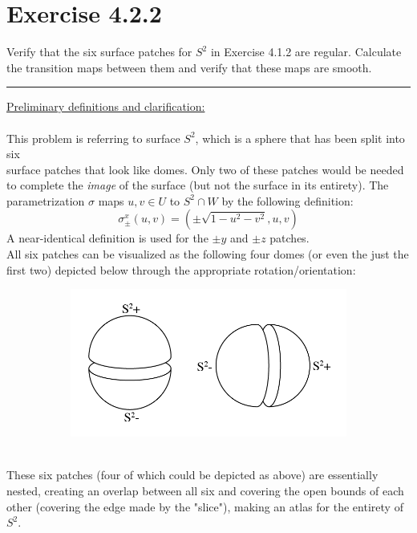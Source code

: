 \documentclass[12pt]{article}
\begin{document}
\maketitle

\section*{Exercise 4.2.2}
Verify that the six surface patches for $S^2$ in Exercise 4.1.2 are regular. Calculate the transition maps between them and verify that these maps are smooth.

\vspace{1cm}
\hrule
\vspace{1cm}
\noindent
\underline{Preliminary definitions and clarification:}\\\\
This problem is referring to surface $S^2$, which is a sphere that has been split into six \\ surface patches that look like domes. Only two of these patches would be needed to complete the \emph{image} of the surface (but not the surface in its entirety). The parametrization $\sigma$ maps $u,v \in U$ to $S^2 \cap W$ by the following definition:
$$
\sigma^{x}_{\pm}(u,v) = (\pm \sqrt{1-u^2-v^2}, u ,v)
$$
\indent
A near-identical definition is used for the $\pm y$ and $\pm z$ patches.\\
\indent
All six patches can be visualized as the following four domes (or even the just the first two) depicted below through the appropriate rotation/orientation:
\begin{figure}[h!]
  \centering
      \begin{subfigure}[b]{0.5\linewidth}
    \includegraphics[width=\linewidth]{./assets/4-2-2/s2-patches.png}
  \end{subfigure}
  \end{figure}
  \\
	\indent
	These six patches (four of which could be depicted as above) are essentially nested, creating an overlap between all six and covering the open bounds of each other (covering the edge made by the "slice"), making an atlas for the entirety of $S^2$.
\end{document}
